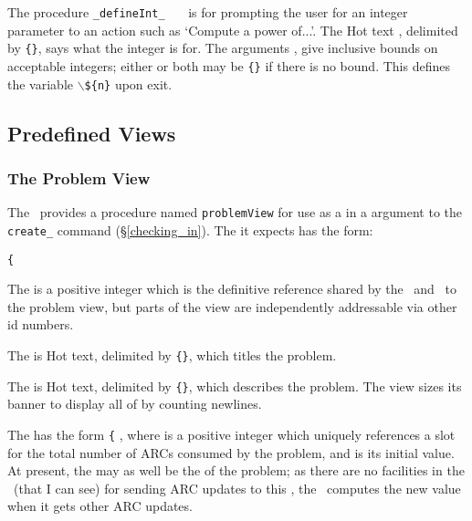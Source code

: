 The procedure {\tt\_defineInt\_}~~~
is for prompting the user for an integer parameter to an action such
as `Compute a power of...'. The {\sf Hot} text , delimited
by {\tt\{\}}, says what the integer is for. The arguments ,
 give inclusive bounds on acceptable integers; either or
both may be {\tt\{\}} if there is no bound.  This defines the variable
$\backslash${\tt\$\{n\}} upon exit.


\subsection{Predefined Views}\label{predefined_views}


\subsubsection{The Problem View}

The \FE\ provides a procedure named {\tt problemView} for use as a
 in a  argument to the {\tt
create\_} command (\S\ref{checking_in}). The  it
expects has the form:

{\tt\{}   

The  is a positive integer which is the definitive
reference shared by the \FE\ and \SM\ to the problem view, but parts
of the view are independently addressable via other id numbers.

The  is {\sf Hot} text, delimited by {\tt\{\}}, which
titles the problem.

The  is {\sf Hot} text, delimited by {\tt\{\}}, which
describes the problem. The view sizes its banner to display all of
 by counting newlines.

The  has the form {\tt\{}
, where  is a positive integer
which uniquely references a slot for the total number of ARCs consumed
by the problem, and  is its initial value. At present, the
 may as well be the  of the problem; as
there are no facilities in the \SM\ (that I can see) for sending ARC
updates to this , the \FE\ computes the new value when
it gets other ARC updates.

